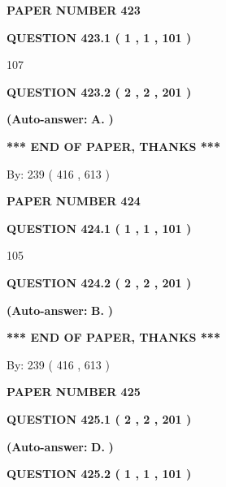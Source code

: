 \documentclass{ctexart}
\begin{document}
   
 {\textbf{ \Large{ PAPER NUMBER  423  }}}
   
   
   
   
  
  
{\textbf{\large{QUESTION
423.1 
 ( 1 , 1 , 101 )
}}}

107
  
  
{\textbf{\large{QUESTION
423.2 
 ( 2 , 2 , 201 )
}}}
 
 
{\textbf{(Auto-answer:}}
{\textbf{\large{
A.}}}
{\textbf{)}}
 
 
   
   
   
   
\vspace{1.0in} 
{\textbf{\large{ *** END OF PAPER, THANKS *** }}} 
   
   
\hspace{1.0in} By: 
 239 ( 416 ,  613 )
   
   
   
   
\newpage 
\setcounter{page}{ 
   424001 } 
   
   
 {\textbf{ \Large{ PAPER NUMBER  424  }}}
   
   
   
   
  
  
{\textbf{\large{QUESTION
424.1 
 ( 1 , 1 , 101 )
}}}

105
  
  
{\textbf{\large{QUESTION
424.2 
 ( 2 , 2 , 201 )
}}}
 
 
{\textbf{(Auto-answer:}}
{\textbf{\large{
B.}}}
{\textbf{)}}
 
 
   
   
   
   
\vspace{1.0in} 
{\textbf{\large{ *** END OF PAPER, THANKS *** }}} 
   
   
\hspace{1.0in} By: 
 239 ( 416 ,  613 )
   
   
   
   
\newpage 
\setcounter{page}{ 
   425001 } 
   
   
 {\textbf{ \Large{ PAPER NUMBER  425  }}}
   
   
   
   
  
  
{\textbf{\large{QUESTION
425.1 
 ( 2 , 2 , 201 )
}}}
 
 
{\textbf{(Auto-answer:}}
{\textbf{\large{
D.}}}
{\textbf{)}}
 
 
  
  
{\textbf{\large{QUESTION
425.2 
 ( 1 , 1 , 101 )
}}}
\end{document}
